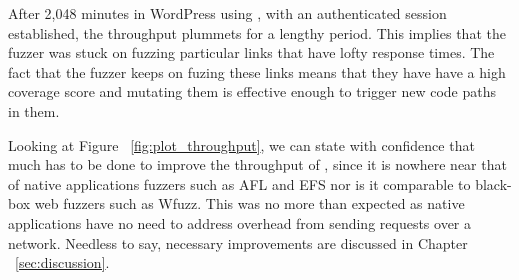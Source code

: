 After 2,048 minutes in WordPress using \pname{}, with an authenticated session established, the throughput plummets for a lengthy period. This implies that the fuzzer was stuck on fuzzing particular links that have lofty response times. The fact that the fuzzer keeps on fuzing these links means that they have have a high coverage score and mutating them is effective enough to trigger new code paths in them.

Looking at Figure ~\ref{fig:plot_throughput}, we can state with confidence that much has to be done to improve the throughput of \pname{}, since it is nowhere near that of native applications fuzzers such as AFL and EFS nor is it comparable to black-box web fuzzers such as Wfuzz. This was no more than expected as native applications have no need to address overhead from sending requests over a network. Needless to say, necessary improvements are discussed in Chapter ~\ref{sec:discussion}.